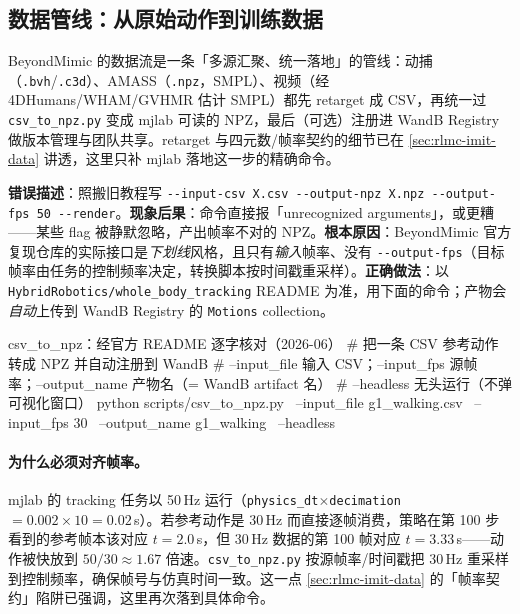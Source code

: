 \subsection{数据管线：从原始动作到训练数据}
\label{sec:rlmc-mi-mjlab-data}

BeyondMimic 的数据流是一条「多源汇聚、统一落地」的管线：动捕（\verb|.bvh|/\verb|.c3d|）、AMASS（\verb|.npz|，SMPL）、视频（经 4DHumans/WHAM/GVHMR 估计 SMPL）都先 retarget 成 CSV，再统一过 \verb|csv_to_npz.py| 变成 mjlab 可读的 NPZ，最后（可选）注册进 WandB Registry 做版本管理与团队共享。retarget 与四元数/帧率契约的细节已在 \cref{sec:rlmc-imit-data} 讲透，这里只补 mjlab 落地这一步的精确命令。

\begin{pitfall}
\textbf{错误描述}：照搬旧教程写 \verb|--input-csv X.csv --output-npz X.npz --output-fps 50 --render|。\textbf{现象后果}：命令直接报「unrecognized arguments」，或更糟——某些 flag 被静默忽略，产出帧率不对的 NPZ。\textbf{根本原因}：BeyondMimic 官方复现仓库的实际接口是\emph{下划线}风格，且只有\emph{输入}帧率、没有 \verb|--output-fps|（目标帧率由任务的控制频率决定，转换脚本按时间戳重采样）。\textbf{正确做法}：以 \texttt{HybridRobotics/whole\_body\_tracking} README 为准，用下面的命令；产物会\emph{自动}上传到 WandB Registry 的 \texttt{Motions} collection。
\end{pitfall}

\begin{codebox}[bash]{csv\_to\_npz：经官方 README 逐字核对（2026-06）}
# 把一条 CSV 参考动作转成 NPZ 并自动注册到 WandB
# --input_file 输入 CSV；--input_fps 源帧率；--output_name 产物名（= WandB artifact 名）
# --headless 无头运行（不弹可视化窗口）
python scripts/csv_to_npz.py \
    --input_file g1_walking.csv \
    --input_fps 30 \
    --output_name g1_walking \
    --headless
\end{codebox}

\paragraph{为什么必须对齐帧率。}mjlab 的 tracking 任务以 50\,Hz 运行（\verb|physics_dt|$\times$\verb|decimation|$=0.002\times10=0.02$\,s）。若参考动作是 30\,Hz 而直接逐帧消费，策略在第 100 步看到的参考帧本该对应 $t=2.0$\,s，但 30\,Hz 数据的第 100 帧对应 $t=3.33$\,s——动作被快放到 $50/30\approx1.67$ 倍速。\verb|csv_to_npz.py| 按源帧率/时间戳把 30\,Hz 重采样到控制频率，确保帧号与仿真时间一致。这一点 \cref{sec:rlmc-imit-data} 的「帧率契约」陷阱已强调，这里再次落到具体命令。

